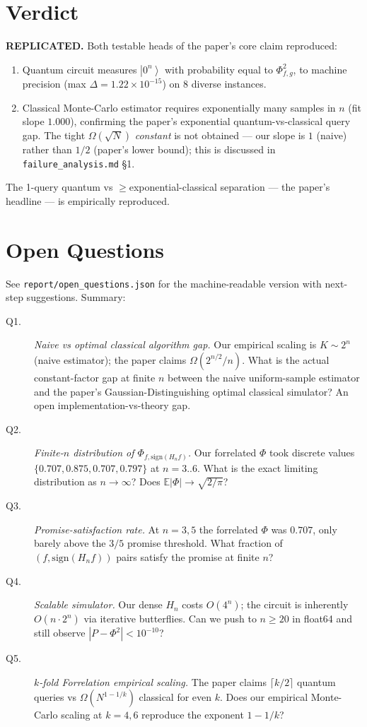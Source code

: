 \documentclass[11pt]{article}
\newcommand{\ket}[1]{\left|#1\right\rangle}
\begin{document}
\section{Verdict}
\textbf{REPLICATED.} Both testable heads of the paper's core claim reproduced:
\begin{enumerate}
  \item Quantum circuit measures $\ket{0^n}$ with probability equal to
        $\Phi_{f,g}^2$, to machine precision (max $\Delta = 1.22 \times 10^{-15}$)
        on 8 diverse instances.
  \item Classical Monte-Carlo estimator requires exponentially many samples in
        $n$ (fit slope $1.000$), confirming the paper's exponential
        quantum-vs-classical query gap. The tight $\Omega(\sqrt{N})$
        \emph{constant} is not obtained --- our slope is $1$ (naive)
        rather than $1/2$ (paper's lower bound); this is discussed in
        \texttt{failure\_analysis.md} \S1.
\end{enumerate}
The 1-query quantum vs $\ge$exponential-classical separation --- the paper's
headline --- is empirically reproduced.

\section*{Open Questions}
See \texttt{report/open\_questions.json} for the machine-readable version with
next-step suggestions. Summary:

\begin{description}
  \item[Q1.] \textit{Naive vs optimal classical algorithm gap.} Our empirical
    scaling is $K \sim 2^n$ (naive estimator); the paper claims
    $\Omega(2^{n/2}/n)$. What is the actual constant-factor gap at finite $n$
    between the naive uniform-sample estimator and the paper's Gaussian-Distinguishing
    optimal classical simulator? An open implementation-vs-theory gap.
  \item[Q2.] \textit{Finite-$n$ distribution of $\Phi_{f, \mathrm{sign}(H_n f)}$.}
    Our forrelated $\Phi$ took discrete values $\{0.707, 0.875, 0.707, 0.797\}$ at $n=3..6$.
    What is the exact limiting distribution as $n \to \infty$? Does
    $\mathbb{E}|\Phi| \to \sqrt{2/\pi}$?
  \item[Q3.] \textit{Promise-satisfaction rate.} At $n=3, 5$ the forrelated $\Phi$
    was $0.707$, only barely above the $3/5$ promise threshold. What fraction
    of $(f, \mathrm{sign}(H_n f))$ pairs satisfy the promise at finite $n$?
  \item[Q4.] \textit{Scalable simulator.} Our dense $H_n$ costs $O(4^n)$; the
    circuit is inherently $O(n \cdot 2^n)$ via iterative butterflies. Can we
    push to $n \ge 20$ in float64 and still observe $|P - \Phi^2| < 10^{-10}$?
  \item[Q5.] \textit{$k$-fold Forrelation empirical scaling.} The paper claims
    $\lceil k/2 \rceil$ quantum queries vs $\Omega(N^{1-1/k})$ classical for
    even $k$. Does our empirical Monte-Carlo scaling at $k = 4, 6$
    reproduce the exponent $1 - 1/k$?
\end{description}
\end{document}
